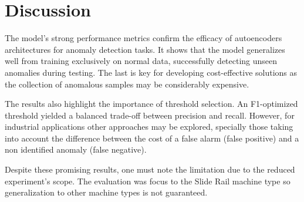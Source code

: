 \section{Discussion}
\label{Sec:Discussion}

The model’s strong performance metrics confirm the efficacy of autoencoders architectures for anomaly detection tasks. It shows that the model generalizes well from training exclusively on normal data, successfully detecting unseen anomalies during testing. The last is key for developing cost-effective solutions as the collection of anomalous samples may be considerably expensive.

The results also highlight the importance of threshold selection. An F1-optimized threshold yielded a balanced trade-off between precision and recall. However, for industrial applications other approaches may be explored, specially those taking into account the difference between the cost of a false alarm (false positive) and a non identified anomaly (false negative). 

Despite these promising results, one must note the limitation due to the reduced experiment's scope. The evaluation was focus to the Slide Rail machine type so generalization to other machine types is not guaranteed.